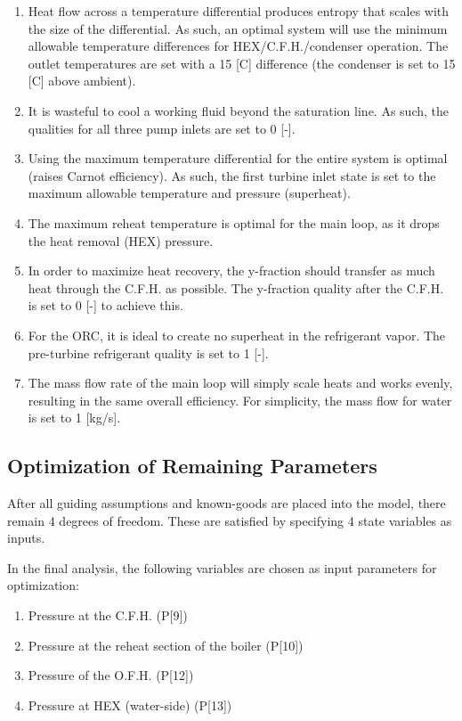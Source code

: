 \documentclass[10pt,cleanfoot]{asme2ej}
\begin{document}
\begin{enumerate}
\item
Heat flow across a temperature differential produces entropy that scales with the size of the differential. As such, an optimal system will use the minimum allowable temperature differences for HEX/C.F.H./condenser operation. The outlet temperatures are set with a 15 [C] difference (the condenser is set to 15 [C] above ambient).
\item
It is wasteful to cool a working fluid beyond the saturation line. As such, the qualities for all three pump inlets are set to 0 [-].
\item
Using the maximum temperature differential for the entire system is optimal (raises Carnot efficiency). As such, the first turbine inlet state is set to the maximum allowable temperature and pressure (superheat).
\item
The maximum reheat temperature is optimal for the main loop, as it drops the heat removal (HEX) pressure.
\item
In order to maximize heat recovery, the y-fraction should transfer as much heat through the C.F.H. as possible. The y-fraction quality after the C.F.H. is set to 0 [-] to achieve this.
\item
For the ORC, it is ideal to create no superheat in the refrigerant vapor. The pre-turbine refrigerant quality is set to 1 [-].
\item
The mass flow rate of the main loop will simply scale heats and works evenly, resulting in the same overall efficiency. For simplicity, the mass flow for water is set to 1 [kg/s].
\end{enumerate}

\subsection{Optimization of Remaining Parameters}

After all guiding assumptions and known-goods are placed into the model, there remain 4 degrees of freedom. These are satisfied by specifying 4 state variables as inputs.

In the final analysis, the following variables are chosen as input parameters for optimization:

\begin{enumerate}
\item
Pressure at the C.F.H. (P[9])
\item
Pressure at the reheat section of the boiler (P[10])
\item
Pressure of the O.F.H. (P[12])
\item
Pressure at HEX (water-side) (P[13])
\end{enumerate}
\end{document}
